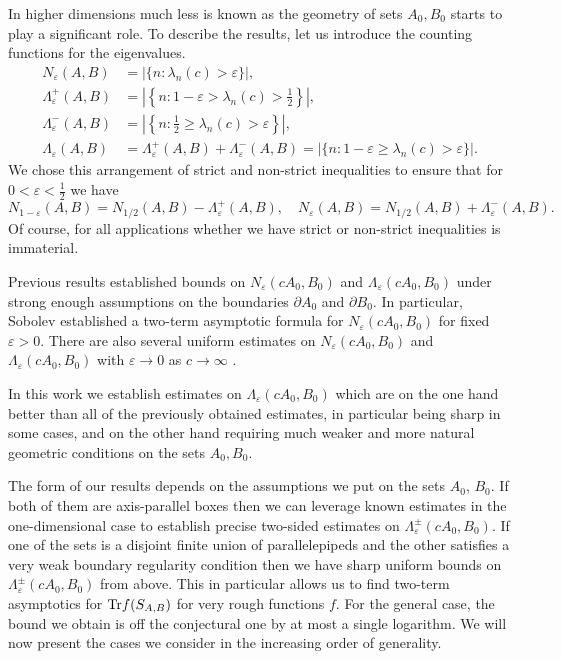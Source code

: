 \documentclass[12pt]{amsart}
\numberwithin{equation}{section}
\newcommand{\eps}{\varepsilon}
\begin{document}
In higher dimensions much less is known as the geometry of sets $A_0, B_0$ starts to play a significant role. To describe the results, let us introduce the counting functions for the eigenvalues.
\begin{equation}\label{counting functions}
\begin{aligned}
N_\eps(A, B) &= |\{n: \lambda_n(c) > \eps\}|,\\
\Lambda^+_\eps(A,B) &= \left|\left\{n: 1 - \eps > \lambda_n(c) > \frac{1}{2}\right\}\right|,\\
\Lambda^-_\eps(A,B) &= \left|\left\{n: \frac{1}{2} \ge \lambda_n(c) > \eps\right\}\right|,\\
\Lambda_\eps(A,B) &= \Lambda^+_\eps(A,B)+\Lambda^-_\eps(A,B) = |\{n: 1 - \eps \ge \lambda_n(c) > \eps\}|.
\end{aligned}
\end{equation} 
We chose this arrangement of strict and non-strict inequalities to ensure that for $0 < \eps < \frac{1}{2}$ we have
\begin{equation}\label{N and Lambda}
N_{1-\eps}(A,B) = N_{1/2}(A,B) - \Lambda_\eps^+(A,B), \quad N_\eps(A,B) = N_{1/2}(A,B) + \Lambda_\eps^-(A,B).
\end{equation}
Of course, for all applications whether we have strict or non-strict inequalities is immaterial.

Previous results established bounds on $N_\eps(cA_0, B_0)$ and $\Lambda_\eps(cA_0,B_0)$ under strong enough assumptions on the boundaries $\partial A_0$ and $\partial B_0$. In particular, Sobolev \cite{Sobolev13} established a two-term asymptotic formula for $N_\eps(cA_0,B_0)$ for fixed $\eps > 0$. There are also several uniform estimates on $N_\eps(cA_0, B_0)$ and $\Lambda_\eps(cA_0, B_0)$ with $\eps \to 0$ as $c\to \infty$ \cites{Israel1,Israel2,bad_combinatorics, Marceca}. 


In this work we establish estimates on $\Lambda_\eps(cA_0, B_0)$ which are on the one hand better than all of the previously obtained estimates, in particular being sharp in some cases, and on the other hand requiring much weaker and more natural geometric conditions on the sets $A_0, B_0$.

The form of our results depends on the assumptions we put on the sets $A_0$, $B_0$. If both of them are axis-parallel boxes then we can leverage known estimates in the one-dimensional case to establish precise two-sided estimates on $\Lambda^{\pm}_\eps(cA_0, B_0)$. If one of the sets is a disjoint finite union of parallelepipeds and the other satisfies a very weak boundary regularity condition then we have sharp uniform bounds on $\Lambda^{\pm}_\eps(cA_0, B_0)$ from above. This in particular allows us to find two-term asymptotics for ${\rm{Tr}}f(S_{A,B})$ for very rough functions $f$. For the general case, the bound we obtain is off the conjectural one by at most a single logarithm. We will now present the cases we consider in the increasing order of generality.
\end{document}
